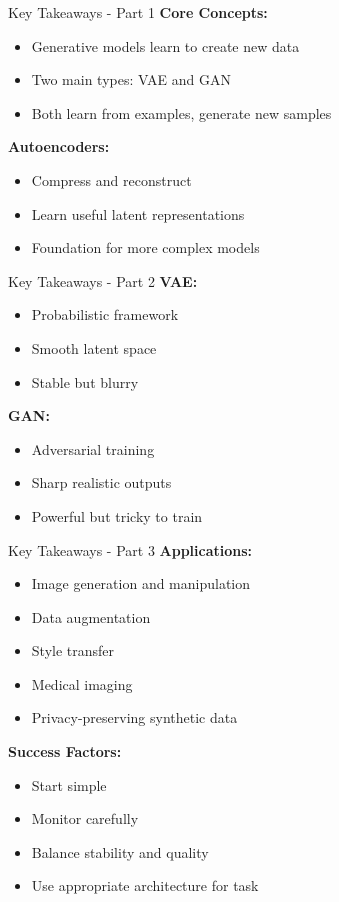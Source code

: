\documentclass[aspectratio=169,10pt]{beamer}
\begin{document}
\begin{frame}{Key Takeaways - Part 1}
\textbf{Core Concepts:}
\begin{itemize}
\item Generative models learn to create new data
\item Two main types: VAE and GAN
\item Both learn from examples, generate new samples
\end{itemize}

\textbf{Autoencoders:}
\begin{itemize}
\item Compress and reconstruct
\item Learn useful latent representations
\item Foundation for more complex models
\end{itemize}
\end{frame}

\begin{frame}{Key Takeaways - Part 2}
\textbf{VAE:}
\begin{itemize}
\item Probabilistic framework
\item Smooth latent space
\item Stable but blurry
\end{itemize}

\textbf{GAN:}
\begin{itemize}
\item Adversarial training
\item Sharp realistic outputs
\item Powerful but tricky to train
\end{itemize}
\end{frame}

\begin{frame}{Key Takeaways - Part 3}
\textbf{Applications:}
\begin{itemize}
\item Image generation and manipulation
\item Data augmentation
\item Style transfer
\item Medical imaging
\item Privacy-preserving synthetic data
\end{itemize}

\textbf{Success Factors:}
\begin{itemize}
\item Start simple
\item Monitor carefully
\item Balance stability and quality
\item Use appropriate architecture for task
\end{itemize}
\end{frame}
\end{document}
